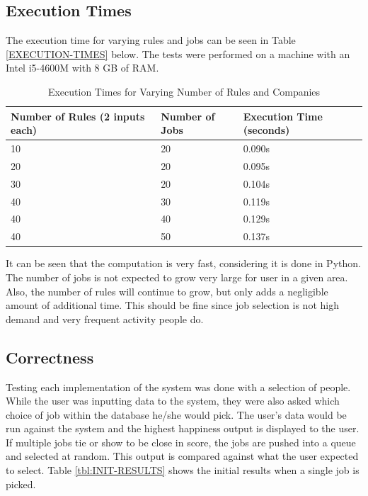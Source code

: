 \documentclass[12pt,fleqn,reqno,letterpaper]{article}
\begin{document}
\subsection{Execution Times}
The execution time for varying rules and jobs can be seen in Table \ref{EXECUTION-TIMES} below. The tests were performed on a machine with an Intel i5-4600M with 8 GB of RAM.

\begin{table}[h]
  \caption{Execution Times for Varying Number of Rules and Companies}
  \label{tbl:EXECUTION-TIMES}
  \centering
\begin{tabular}{|p{7cm}|p{3.5cm}|p{5.5cm}|}
\hline
\textbf{Number of Rules (2 inputs each)} & \textbf{Number of Jobs} & \textbf{Execution Time (seconds)} \\ \hline
10                                       & 20                      & 0.090s                            \\ \hline
20                                       & 20                      & 0.095s                            \\ \hline
30                                       & 20                      & 0.104s                            \\ \hline
40                                       & 30                      & 0.119s                            \\ \hline
40                                       & 40                      & 0.129s                            \\ \hline
40                                       & 50                      & 0.137s                            \\ \hline
\end{tabular}
\end{table}

It can be seen that the computation is very fast, considering it is done in Python. The number of jobs is not expected to grow very large for user in a given area. Also, the number of rules will continue to grow, but only adds a negligible amount of additional time. This should be fine since job selection is not high demand and very frequent activity people do.

\subsection{Correctness}
Testing each implementation of the system was done with a selection of people.  While the user was inputting data to the system, they were also asked which choice of job within the database he/she would pick.  The user’s data would be run against the system and the highest happiness output is displayed to the user.  If multiple jobs tie or show to be close in score, the jobs are pushed into a queue and selected at random. This output is compared against what the user expected to select.  Table \ref{tbl:INIT-RESULTS} shows the initial results when a single job is picked.
\end{document}
